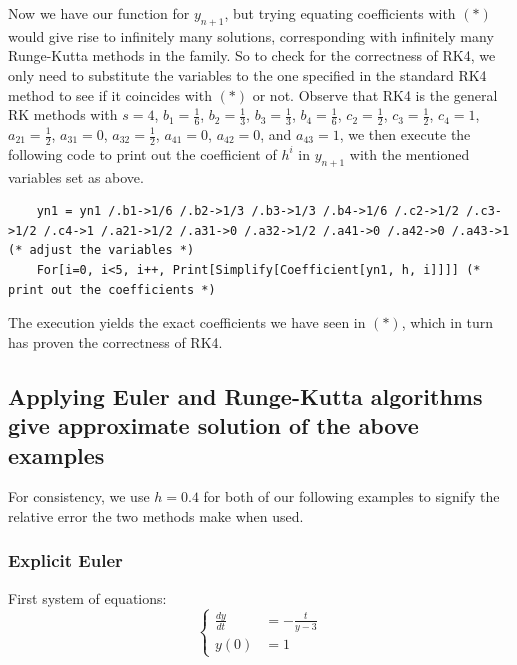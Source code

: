 \documentclass[a4paper]{article}
\begin{document}
Now we have our function for \(y_{n+1}\), but trying equating coefficients with \((*)\) would give rise to infinitely many solutions, corresponding with infinitely many Runge-Kutta methods in the family. So to check for the correctness of RK4, we only need to substitute the variables to the one specified in the standard RK4 method to see if it coincides with \((*)\) or not. Observe that RK4 is the general RK methods with \(s = 4\), \(b_1 = \frac{1}{6}\), \(b_2 = \frac{1}{3}\), \(b_3 = \frac{1}{3}\), \(b_4 = \frac{1}{6}\), \(c_2 = \frac{1}{2}\), \(c_3 = \frac{1}{2}\), \(c_4 = 1\), \(a_{21} = \frac{1}{2}\), \(a_{31} = 0\), \(a_{32} = \frac{1}{2}\), \(a_{41} = 0\), \(a_{42} = 0\), and \(a_{43} = 1\), we then execute the following code to print out the coefficient of \(h^i\) in \(y_{n+1}\) with the mentioned variables set as above.
\begin{mdframed}[leftline=false,rightline=false,backgroundcolor=magenta!10]
  \begin{verbatim}
    yn1 = yn1 /.b1->1/6 /.b2->1/3 /.b3->1/3 /.b4->1/6 /.c2->1/2 /.c3->1/2 /.c4->1 /.a21->1/2 /.a31->0 /.a32->1/2 /.a41->0 /.a42->0 /.a43->1 (* adjust the variables *)
    For[i=0, i<5, i++, Print[Simplify[Coefficient[yn1, h, i]]]] (* print out the coefficients *)
  \end{verbatim}
\end{mdframed}

The execution yields the exact coefficients we have seen in \((*)\), which in turn has proven the correctness of RK4.

\subsection{Applying Euler and Runge-Kutta algorithms give approximate solution of the above examples}
For consistency, we use \(h = 0.4\) for both of our following examples to signify the relative error the two methods make when used.

\subsubsection{Explicit Euler}
First system of equations:
\begin{equation*}
  \begin{cases}
    \frac{dy}{dt} & = - \frac{t}{y - 3} \\
    y(0)          & = 1
  \end{cases}
\end{equation*}
\end{document}
